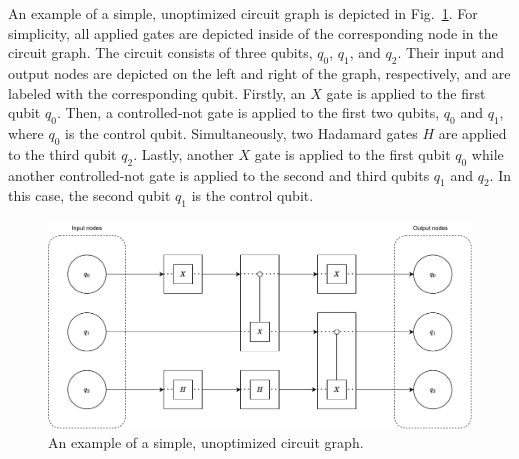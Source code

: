 An example of a simple, unoptimized circuit graph is depicted in Fig.~\ref{fig:circuit_graph_unoptimized}. For simplicity, all applied gates are depicted inside of the corresponding node in the circuit graph. The circuit consists of three qubits, $q_0$, $q_1$, and $q_2$. Their input and output nodes are depicted on the left and right of the graph, respectively, and are labeled with the corresponding qubit. Firstly, an $X$ gate is applied to the first qubit $q_0$. Then, a controlled-not gate is applied to the first two qubits, $q_0$ and $q_1$, where $q_0$ is the control qubit. Simultaneously, two Hadamard gates $H$ are applied to the third qubit $q_2$. Lastly, another $X$ gate is applied to the first qubit $q_0$ while another controlled-not gate is applied to the second and third qubits $q_1$ and $q_2$. In this case, the second qubit $q_1$ is the control qubit.

\begin{figure}[htp]
    \centering     
    \includegraphics[width=.9\textwidth]{../figures/drawio/circuit_graph_unoptimized.pdf}
    \caption{An example of a simple, unoptimized circuit graph.}
    \label{fig:circuit_graph_unoptimized}
\end{figure}

